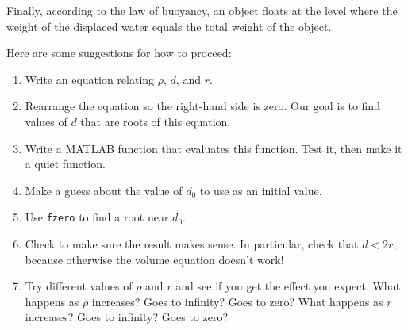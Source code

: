 Finally, according to the law of buoyancy, an object floats at the level where the weight of the displaced water equals the total weight of the object.


Here are some suggestions for how to proceed:

\begin{enumerate}

\item Write an equation relating $\rho$, $d$, and $r$.

\item Rearrange the equation so the right-hand side is zero.
Our goal is to find values of $d$ that are roots of this equation.

\item Write a MATLAB function that evaluates this function.  Test it,
   then make it a quiet function.

\item Make a guess about the value of $d_0$ to use as an initial value.

\item Use \lstinline{fzero} to find a root near $d_0$.

\item Check to make sure the result makes sense.  In particular,
   check that $d < 2 r$, because otherwise the volume equation
   doesn't work!

\item Try different values of $\rho$ and $r$ and see if you get the
  effect you expect.  What happens as $\rho$ increases?  Goes to
  infinity?  Goes to zero?  What happens as $r$ increases?  Goes to
  infinity?  Goes to zero?

\end{enumerate}



